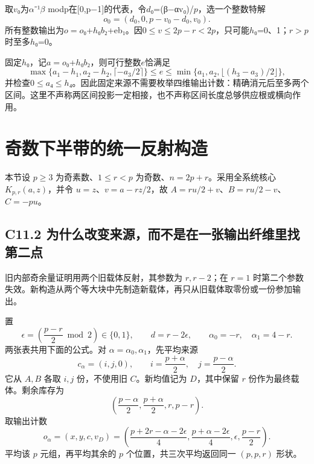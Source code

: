 {取\ensuremath{v}₀为\ensuremath{\alpha }⁻¹\ensuremath{\beta }} {modp在{[}0,p−1{]}的代表，令\ensuremath{d}₀=(β−αv₀)/\ensuremath{p}，选一个整数特解} \[
o_0=(d_0,0,p-v_0-d_0,v_0).
\] {所有整数输出为\ensuremath{o=o}₀+\ensuremath{h}₀\ensuremath{b}₂+eb₁。因0\ensuremath{\le}\ensuremath{v}\ensuremath{\le}\ensuremath{2p-r<2p}，只可能\ensuremath{h}₀=0、1；\ensuremath{r>p}时至多\ensuremath{h}₀=0。}

{固定\ensuremath{h}₀，记\ensuremath{a=o}₀+\ensuremath{h}₀\ensuremath{b}₂，则可行整数\ensuremath{e}恰满足} \[
\max\{a_1-h_1,a_2-h_2,\lceil-a_3/2\rceil\}
\le e\le
\min\{a_1,a_2,\lfloor(h_3-a_3)/2\rfloor\},
\tag{C10.3.9}
\] {并检查0\ensuremath{\le}\ensuremath{a}₄\ensuremath{\le}\ensuremath{h}₄。因此固定来源不需要枚举四维输出计数：精确消元后至多两个区间。这里不声称两区间投影一定相接，也不声称区间长度总够供应根或横向作用。}


\section{奇数下半带的统一反射构造}\label{construct:odd-pencil}
{本节设} \(p\ge3\) {为奇素数、}\(1\le r<p\) {为奇数、}\(n=2p+r\){。采用全系统核心} \(K_{p,r}(a,z)\){，并令} \(u=z\){、}\(v=a-rz/2\){，故} \(A=ru/2+v\){、}\(B=ru/2-v\){、}\(C=-pu\){。}

\subsection*{\texorpdfstring{{C11.2} {为什么改变来源，而不是在一张输出纤维里找第二点}}{C11.2 为什么改变来源，而不是在一张输出纤维里找第二点}}\label{C11-h78}

{旧内部奇余量证明用两个旧载体反射，其参数为} \(r,r-2\){；在} \(r=1\) {时第二个参数失效。新构造从两个等大块中先制造新载体，再只从旧载体取零份或一份参加输出。}

{置} \[
\epsilon=\left(\frac{p-r}{2}\bmod2\right)\in\{0,1\},\qquad
d=r-2\epsilon,\qquad
\alpha_0=-r,\quad \alpha_1=4-r.
\tag{C11.2.1}
\] {两张表共用下面的公式。对} \(\alpha=\alpha_0,\alpha_1\){，先平均来源} \[
c_\alpha=(i,j,0),\qquad
i=\frac{p+\alpha}{2},\quad j=\frac{p-\alpha}{2}.
\tag{C11.2.2}
\] {它从} \(A,B\) {各取} \(i,j\) {份，不使用旧} \(C\){。新均值记为} \(D\){，其中保留} \(r\) {份作为最终载体。剩余库存为} \[
\left(\frac{p-\alpha}{2},\frac{p+\alpha}{2},r,p-r\right).
\tag{C11.2.3}
\] {取输出计数} \[
o_\alpha=(x,y,c,v_D)=
\left(
\frac{p+2r-\alpha-2\epsilon}{4},
\frac{p+\alpha-2\epsilon}{4},
\epsilon,
\frac{p-r}{2}
\right).
\tag{C11.2.4}
\] {平均该} \(p\) {元组，再平均其余的} \(p\) {个位置，共三次平均返回同一} \((p,p,r)\) {形状。}

